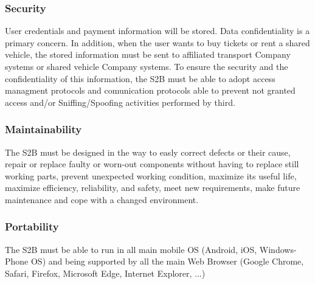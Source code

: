 	\subsubsection{Security}
User credentials and payment information will be stored. Data confidentiality is a primary concern.
In addition, when the user wants to buy tickets or rent a shared vehicle, the stored information must be sent to affiliated  transport Company systems or shared vehicle Company  systems. To ensure the security and the confidentiality of this information, the S2B must be able to adopt  access managment protocols and comunication protocols able to prevent not granted access and/or Sniffing/Spoofing activities performed by third.
	
	\subsubsection{Maintainability}
	The S2B must be designed in the way to easly correct defects or their cause,
	repair or replace faulty or worn-out components without having to replace still working parts,
	prevent unexpected working condition,
	maximize its useful life,
	maximize efficiency, reliability, and safety,
	meet new requirements,
	make future maintenance and
	cope with a changed environment.
	
	\subsubsection{Portability}
	The S2B must be able to run in all main mobile OS (Android, iOS, Windows-Phone OS) and being supported by all the main Web Browser (Google Chrome, Safari, Firefox, Microsoft Edge, Internet Explorer, ...)\newline
	
